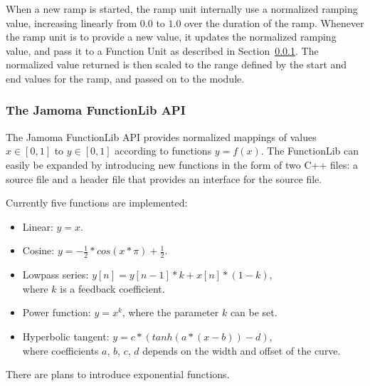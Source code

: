 \documentclass{sig-alternate}
\begin{document}
When a new ramp is started, the ramp unit internally use a normalized ramping value, increasing linearly from $0.0$ to $1.0$ over the duration of the ramp. Whenever the ramp unit is to provide a new value, it updates the normalized ramping value, and pass it to a Function Unit as described in Section~\ref{ssub:the_function_lib}. The normalized value returned is then scaled to the range defined by the start and end values for the ramp, and passed on to the module.



\subsubsection{The Jamoma FunctionLib API} %
\label{ssub:the_function_lib}

The Jamoma FunctionLib API provides normalized mappings of values $x \in [0,1]$ to $y \in [0,1]$ according to functions $y = f(x)$. The FunctionLib can easily be expanded by introducing new functions in the form of two C++ files: a source file and a header file that provides an interface for the source file.

Currently five functions are implemented: 

\begin{itemize}

	\item Linear: $y = x$.

	\item Cosine: $y = - \frac{1}{2} * cos(x * \pi ) + \frac{1}{2} $.

	\item Lowpass series: $y[n] = y[n-1] * k + x[n] * (1-k)$, \\ where $k$ is a feedback coefficient.

	\item Power function: $ y = x^{k} $, where the parameter $k$ can be set.

	\item Hyperbolic tangent: $ y = c * (tanh(a*(x-b)) - d) $, \\ where coefficients $a$, $b$, $c$, $d$ depends on the width and offset of the curve.
	
\end{itemize}

There are plans to introduce exponential functions.

\end{document}
